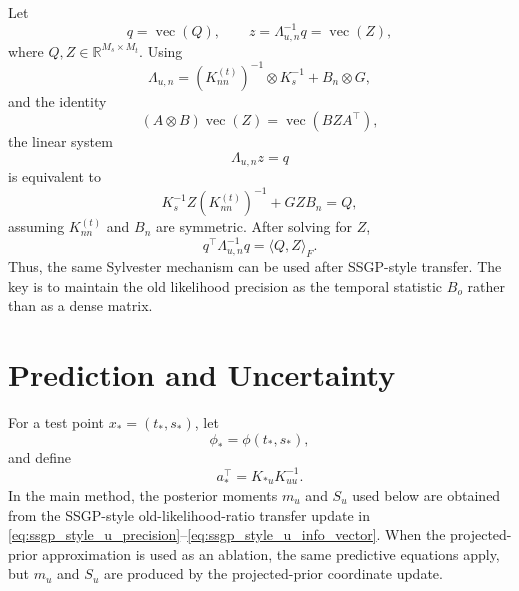 \documentclass[12pt]{article}
\newcommand{\vecop}{\operatorname{vec}}
\begin{document}
Let
\begin{equation}
    q=\vecop(Q),
    \qquad
    z=\Lambda_{u,n}^{-1}q=\vecop(Z),
\end{equation}
where \(Q,Z\in\mathbb{R}^{M_s\times M_t}\). Using
\begin{equation}
    \Lambda_{u,n}
    =
    \left(K_{nn}^{(t)}\right)^{-1}
    \otimes
    K_s^{-1}
    +
    B_n\otimes G,
\end{equation}
and the identity
\begin{equation}
    (A\otimes B)\vecop(Z)
    =
    \vecop(BZA^\top),
\end{equation}
the linear system
\begin{equation}
    \Lambda_{u,n}z=q
\end{equation}
is equivalent to
\begin{equation}
    K_s^{-1}Z
    \left(K_{nn}^{(t)}\right)^{-1}
    +
    GZB_n
    =
    Q,
    \label{eq:sylvester_after_ssgp_transfer}
\end{equation}
assuming \(K_{nn}^{(t)}\) and \(B_n\) are symmetric. After solving for \(Z\),
\begin{equation}
    q^\top\Lambda_{u,n}^{-1}q
    =
    \langle Q,Z\rangle_F.
\end{equation}
Thus, the same Sylvester mechanism can be used after SSGP-style transfer. The key is to
maintain the old likelihood precision as the temporal statistic \(B_o\) rather than as a
dense matrix.

\section{Prediction and Uncertainty}
\label{sec:prediction_uncertainty}

For a test point \(x_*=(t_*,s_*)\), let
\begin{equation}
    \phi_*=\phi(t_*,s_*),
\end{equation}
and define
\begin{equation}
    a_*^\top=K_{*u}K_{uu}^{-1}.
\end{equation}
In the main method, the posterior moments \(m_u\) and \(S_u\) used below are obtained
from the SSGP-style old-likelihood-ratio transfer update in
\eqref{eq:ssgp_style_u_precision}--\eqref{eq:ssgp_style_u_info_vector}. When the
projected-prior approximation is used as an ablation, the same predictive equations
apply, but \(m_u\) and \(S_u\) are produced by the projected-prior coordinate update.
\end{document}
